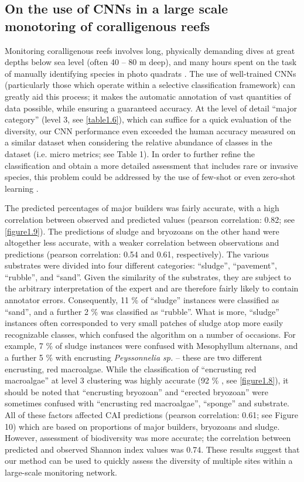 \subsection{On the use of CNNs in a large scale monotoring of coralligenous reefs}\label{chapitre1_7.4}
Monitoring coralligenous reefs involves long, physically demanding dives at great depths below sea level (often 40 – 80 m deep), and many hours spent on the task of manually identifying species in photo quadrats \citep{deter_rapid_2012}. The use of well-trained CNNs (particularly those which operate within a selective classification framework) can greatly aid this process; it makes the automatic annotation of vast quantities of data possible, while ensuring a guaranteed accuracy. At the level of detail “major category” (level 3, see \autoref{table1.6}), which can suffice for a quick evaluation of the diversity, our CNN performance even exceeded the human accuracy measured on a similar dataset when considering the relative abundance of classes in the dataset (i.e. micro metrics; see Table 1). In order to further refine the classification and obtain a more detailed assessment that includes rare or invasive species, this problem could be addressed by the use of few-shot or even zero-shot learning \citep{liu_generalized_2018}.

The predicted percentages of major builders was fairly accurate, with a high correlation between observed and predicted values (pearson correlation: 0.82; see \autoref{figure1.9}). The predictions of sludge and bryozoans on the other hand were altogether less accurate, with a weaker correlation between observations and predictions (pearson correlation: 0.54 and 0.61, respectively). The various substrates were divided into four different categories: “sludge”, “pavement”, “rubble”, and “sand”. Given the similarity of the substrates, they are subject to the arbitrary interpretation of the expert and are therefore fairly likely to contain annotator errors. Consequently, 11 \% of “sludge” instances were classified as “sand”, and a further 2 \% was classified as “rubble”. What is more, “sludge” instances often corresponded to very small patches of sludge atop more easily recognizable classes, which confused the algorithm on a number of occasions. For example, 7 \% of sludge instances were confused with Mesophyllum alternans, and a further 5 \% with encrusting \textit{Peyssonnelia sp.} – these are two different encrusting, red macroalgae. While the classification of “encrusting red macroalgae” at level 3 clustering was highly accurate (92 \% , see \autoref{figure1.8}), it should be noted that “encrusting bryozoan” and “erected bryozoan” were sometimes confused with “encrusting red macroalgae”, “sponge” and substrate. All of these factors affected CAI predictions (pearson correlation: 0.61; see Figure 10) which are based on proportions of major builders, bryozoans and sludge. However, assessment of biodiversity was more accurate; the correlation between predicted and observed Shannon index values was 0.74. These results suggest that our method can be used to quickly assess the diversity of multiple sites within a large-scale monitoring network.

